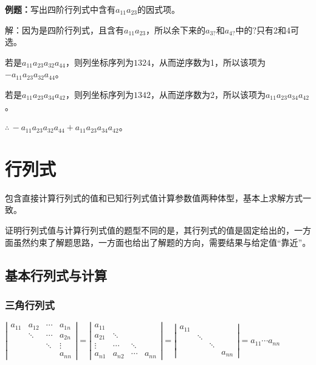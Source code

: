 \documentclass[UTF8, 12pt]{ctexart}
\begin{document}
\textbf{例题：}写出四阶行列式中含有$a_{11}a_{23}$的因式项。

解：因为是四阶行列式，且含有$a_{11}a_{23}$，所以余下来的$a_{3?}$和$a_{4?}$中的$?$只有2和4可选。

若是$a_{11}a_{23}a_{32}a_{44}$，则列坐标序列为$1324$，从而逆序数为1，所以该项为$-a_{11}a_{23}a_{32}a_{44}$。

若是$a_{11}a_{23}a_{34}a_{42}$，则列坐标序列为$1342$，从而逆序数为2，所以该项为$a_{11}a_{23}a_{34}a_{42}$。

$\therefore\,-a_{11}a_{23}a_{32}a_{44}+a_{11}a_{23}a_{34}a_{42}$。

\section{行列式}

包含直接计算行列式的值和已知行列式值计算参数值两种体型，基本上求解方式一致。

证明行列式值与计算行列式值的题型不同的是，其行列式的值是固定给出的，一方面虽然约束了解题思路，一方面也给出了解题的方向，需要结果与给定值“靠近”。

\subsection{基本行列式与计算}

\subsubsection{三角行列式}

$\left|\begin{array}{cccc} 
    a_{11} & a_{12} & \cdots & a_{1n} \\
     & \ddots & \cdots & a_{2n} \\
     & & \ddots & \vdots  \\
     & & & a_{nn}
\end{array}\right|=
\left|\begin{array}{cccc} 
    a_{11} & & & \\
    a_{21} & \ddots & & \\
    \vdots & \cdots & \ddots &  \\
    a_{n1} & a_{n2} & \cdots & a_{nn}
\end{array}\right|=
\left|\begin{array}{cccc} 
    a_{11} & & & \\
     & \ddots & & \\
     & & \ddots &  \\
     & & & a_{nn}
\end{array}\right|=a_{11}\cdots a_{nn}$
\end{document}
